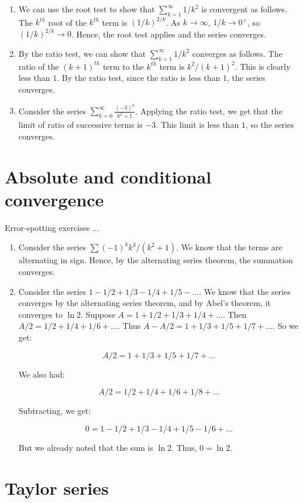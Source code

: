 \documentclass[10pt]{amsart}
\begin{document}
\begin{enumerate}
\item We can use the root test to show that $\sum_{k=1}^\infty 1/k^2$
  is convergent as follows. The $k^{th}$ root of the $k^{th}$ term is
  $(1/k)^{2/k}$. As $k \to \infty$, $1/k \to 0^+$, so $(1/k)^{2/k} \to
  0$. Hence, the root test applies and the series converges.
\item By the ratio test, we can show that $\sum_{k=1}^\infty 1/k^2$
  converges as follows. The ratio of the $(k+1)^{th}$ term to the
  $k^{th}$ term is $k^2/(k + 1)^2$. This is clearly less than $1$. By
  the ratio test, since the ratio is less than $1$, the series
  converges.
\item Consider the series $\sum_{k=0}^\infty \frac{(-3)^k}{k^2 +
  1}$. Applying the ratio test, we get that the limit of ratio of
  successive terms is $-3$. This limit is less than $1$, so the series
  converges.
\end{enumerate}

\section{Absolute and conditional convergence}

Error-spotting exercises ...

\begin{enumerate}
\item Consider the series $\sum (-1)^k k^3/(k^2 + 1)$. We know that
  the terms are alternating in sign. Hence, by the alternating series
  theorem, the summation converges.
\item Consider the series $1 - 1/2 + 1/3 - 1/4 + 1/5 - \dots$. We know
  that the series converges by the alternating series theorem, and by
  Abel's theorem, it converges to $\ln 2$. Suppose $A = 1 + 1/2 + 1/3
  + 1/4 + \dots$. Then $A/2 = 1/2 + 1/4 + 1/6 + \dots$. Thus $A - A/2
  = 1 + 1/3 + 1/5 + 1/7 + \dots$. So we get:

  $$A/2 = 1 + 1/3 + 1/5 + 1/7 + \dots$$

  We also had:

  $$A/2 = 1/2 + 1/4 + 1/6 + 1/8 + \dots$$

  Subtracting, we get:

  $$0 = 1 - 1/2 + 1/3 - 1/4 + 1/5 - 1/6 + \dots$$

  But we already noted that the sum is $\ln 2$. Thus, $0 = \ln 2$.
\end{enumerate}

\section{Taylor series}
\end{document}
